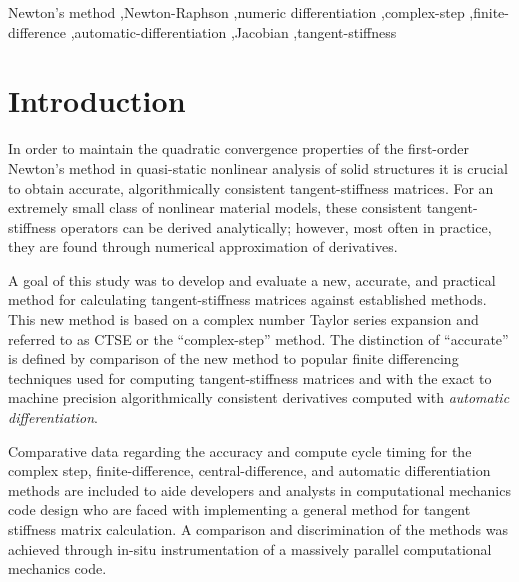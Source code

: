 \documentclass[preprint,12pt]{elsarticle}
\begin{document}
\begin{frontmatter}
\begin{abstract}
\end{abstract}

\begin{keyword}
Newton's method \sep Newton-Raphson \sep numeric differentiation \sep complex-step \sep finite-difference \sep automatic-differentiation \sep Jacobian \sep tangent-stiffness
\end{keyword}

\end{frontmatter}



\section{Introduction}
\label{sec:intro} 
In order to maintain the quadratic convergence properties of the first-order Newton's method \cite{belytschko1999nonlinear} \cite[Ch.~13]{young2009} in quasi-static nonlinear analysis of solid structures it is crucial to obtain accurate, algorithmically consistent tangent-stiffness matrices. For an extremely small class of nonlinear material models, these consistent tangent-stiffness operators can be derived analytically; however, most often in practice, they are found through numerical approximation of derivatives. 

A goal of this study was to develop and evaluate a new, accurate, and practical method for calculating tangent-stiffness matrices against established methods.  This new method is based on a complex number Taylor series expansion and referred to as CTSE or the ``complex-step'' method.  The
distinction of ``accurate'' is defined by comparison of the new method to popular finite differencing techniques used for computing tangent-stiffness matrices and with the exact to machine precision algorithmically consistent derivatives computed with \emph{automatic differentiation}.

Comparative data regarding the accuracy and compute cycle timing for the complex step, finite-difference, central-difference, and automatic differentiation methods are included to aide developers and analysts in computational mechanics code design who are faced with implementing a general method for tangent stiffness matrix calculation.  A comparison and discrimination of the methods was achieved through in-situ instrumentation of a massively parallel computational mechanics code.   
\end{document}
